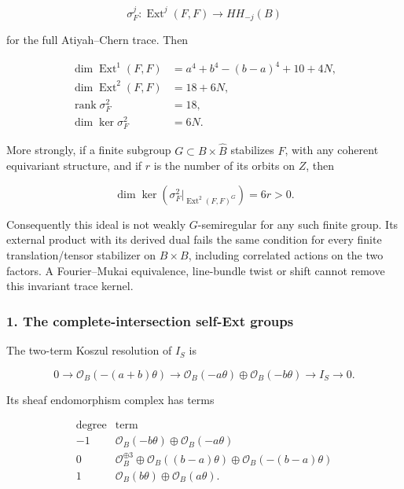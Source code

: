 \[
 \sigma_F^j:\operatorname{Ext}^j(F,F)\longrightarrow HH_{-j}(B)
\]

for the full Atiyah--Chern trace. Then

\[
 \begin{aligned}
 \dim\operatorname{Ext}^1(F,F)
   &=a^4+b^4-(b-a)^4+10+4N,\\
 \dim\operatorname{Ext}^2(F,F)&=18+6N,\\
 \operatorname{rank}\sigma_F^2&=18,\\
 \dim\ker\sigma_F^2&=6N.
 \end{aligned}
 \tag{E809.1}
\]

More strongly, if a finite subgroup \(G\subset B\times\widehat B\)
stabilizes \(F\), with any coherent equivariant structure, and if \(r\)
is the number of its orbits on \(Z\), then

\[
 \dim\ker\left(\sigma_F^2|_{\operatorname{Ext}^2(F,F)^G}\right)=6r>0.
 \tag{E809.2}
\]

Consequently this ideal is not weakly \(G\)-semiregular for any such
finite group. Its external product with its derived dual fails the same
condition for every finite translation/tensor stabilizer on
\(B\times B\), including correlated actions on the two factors. A
Fourier--Mukai equivalence, line-bundle twist or shift cannot remove
this invariant trace kernel.

\subsubsection{1. The complete-intersection self-Ext
groups}\label{the-complete-intersection-self-ext-groups}

The two-term Koszul resolution of \(I_S\) is

\[
 0\longrightarrow\mathcal O_B(-(a+b)\theta)
 \longrightarrow\mathcal O_B(-a\theta)\oplus\mathcal O_B(-b\theta)
 \longrightarrow I_S\longrightarrow0.
 \tag{E809.3}
\]

Its sheaf endomorphism complex has terms

\[
 \begin{array}{c|c}
 \text{degree}&\text{term}\\ \hline
 -1&\mathcal O_B(-b\theta)\oplus\mathcal O_B(-a\theta)\\
 0&\mathcal O_B^{\oplus3}\oplus\mathcal O_B((b-a)\theta)
                          \oplus\mathcal O_B(-(b-a)\theta)\\
 1&\mathcal O_B(b\theta)\oplus\mathcal O_B(a\theta).
 \end{array}
 \tag{E809.4}
\]

